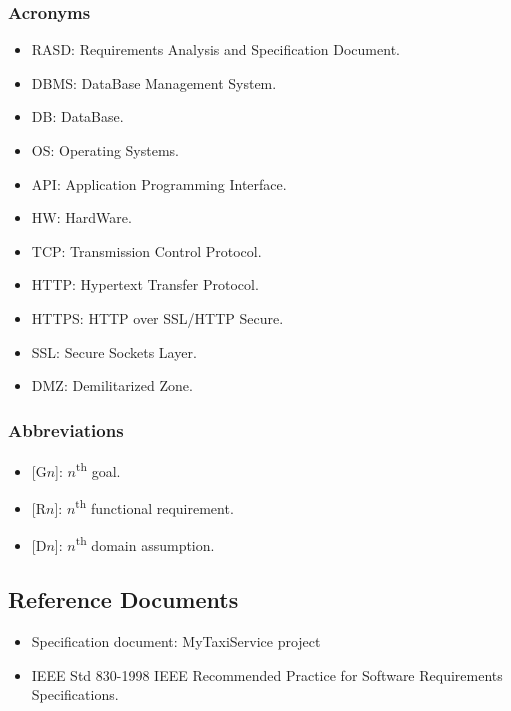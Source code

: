 \documentclass[a4paper,11pt]{report} %
\begin{document}
	\subsubsection{Acronyms}
	\begin{itemize}
		\item RASD: Requirements Analysis and Specification Document.
		\item DBMS: DataBase Management System.
		\item DB: DataBase.
		\item OS: Operating Systems.
		\item API: Application Programming Interface.
		\item HW: HardWare.
		\item TCP: Transmission Control Protocol.
		\item HTTP: Hypertext Transfer Protocol.
		\item HTTPS: HTTP over SSL/HTTP Secure.
		\item SSL: Secure Sockets Layer.
		\item DMZ: Demilitarized Zone.
		
	\end{itemize}
	
		\subsubsection{Abbreviations}
		\begin{itemize}
			\item {[}G$n${]}: $n$\textsuperscript{th} goal.
			\item {[}R$n${]}: $n$\textsuperscript{th} functional requirement.
			\item {[}D$n${]}: $n$\textsuperscript{th} domain assumption.
		\end{itemize}
	
	\subsection{Reference Documents}
		\begin{itemize}
			\item Specification document: MyTaxiService project
			\item IEEE Std 830-1998 IEEE Recommended Practice for Software Requirements	Specifications.
		\end{itemize}
	
\end{document}
